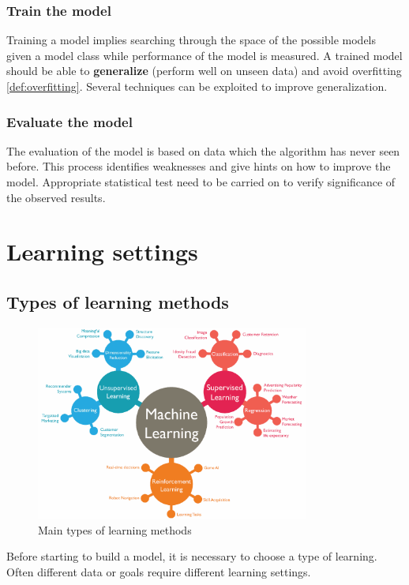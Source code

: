 \subsubsection*{Train the model}
Training a model implies searching through the space of the possible models given
a model class while performance of the model is measured. A trained model should
be able to \textbf{generalize} (perform well on unseen data) and avoid overfitting
\ref{def:overfitting}. Several techniques can be exploited to improve
generalization.

\subsubsection*{Evaluate the model}
The evaluation of the model is based on data which the algorithm has never seen
before. This process identifies weaknesses and give hints on how to improve the model.
Appropriate statistical test need to be carried on to verify significance of the
observed results.

\section{Learning settings}

\subsection{Types of learning methods}
\begin{figure}
	\centering
	\includegraphics[width=0.8\textwidth]{
		images/01_Introduction_machineLearningAlgorithms.png
	}
	\caption{Main types of learning methods}
	\label{learning_methods_fig}
\end{figure}

Before starting to build a model, it is necessary to choose a type of learning.
Often different data or goals require different learning settings.

